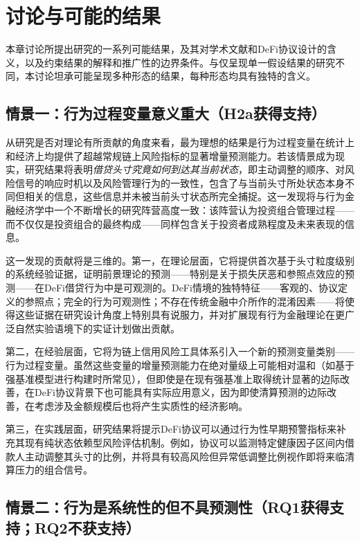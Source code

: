 \section{讨论与可能的结果}

本章讨论所提出研究的一系列可能结果，及其对学术文献和DeFi协议设计的含义，以及约束结果的解释和推广性的边界条件。与仅呈现单一假设结果的研究不同，本讨论坦承可能呈现多种形态的结果，每种形态均具有独特的含义。

\subsection{情景一：行为过程变量意义重大（H2a获得支持）}

从研究是否对理论有所贡献的角度来看，最为理想的结果是行为过程变量在统计上和经济上均提供了超越常规链上风险指标的显著增量预测能力。若该情景成为现实，研究结果将表明\emph{借贷头寸究竟如何到达其当前状态}，即主动调整的顺序、对风险信号的响应时机以及风险管理行为的一致性，包含了与当前头寸所处状态本身不同但相关的信息，这些信息并未被当前头寸状态所完全捕捉。这一发现将与行为金融经济学中一个不断增长的研究阵营高度一致：该阵营认为投资组合管理过程——而不仅仅是投资组合的最终构成——同样包含关于投资者成熟程度及未来表现的信息。

这一发现的贡献将是三维的。第一，在理论层面，它将提供首次基于头寸粒度级别的系统经验证据，证明前景理论的预测——特别是关于损失厌恶和参照点效应的预测——在DeFi借贷行为中是可观测的。DeFi情境的独特特征——客观的、协议定义的参照点；完全的行为可观测性；不存在传统金融中介所作的混淆因素——将使得这些证据在研究设计角度上特别具有说服力，并对扩展现有行为金融理论在更广泛自然实验语境下的实证计划做出贡献。

第二，在经验层面，它将为链上信用风险工具体系引入一个新的预测变量类别——行为过程变量。虽然这些变量的增量预测能力在绝对量级上可能相对温和（如基于强基准模型进行构建时所常见），但即使是在现有强基准上取得统计显著的边际改善，在DeFi协议背景下也可能具有实际应用意义，因为即使清算预测的边际改善，在考虑涉及金额规模后也将产生实质性的经济影响。

第三，在实践层面，研究结果将提示DeFi协议可以通过行为性早期预警指标来补充其现有纯状态依赖型风险评估机制。例如，协议可以监测特定健康因子区间内借款人主动调整其头寸的比例，并将具有较高风险但异常低调整比例视作即将来临清算压力的组合信号。

\subsection{情景二：行为是系统性的但不具预测性（RQ1获得支持；RQ2不获支持）}

